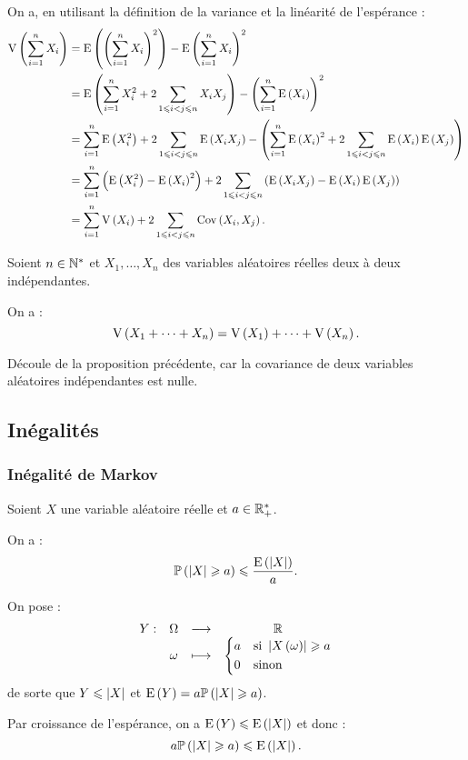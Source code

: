 \begin{dem}
On a, en utilisant la définition de la variance et la linéarité de l'espérance : \[\begin{aligned}
\vari{\sum_{i=1}^nX_i}&=\esp{\paren{\sum_{i=1}^nX_i}^2}-\esp{\sum_{i=1}^nX_i}^2 \\
&=\esp{\sum_{i=1}^nX_i^2+2\sum_{1\leq i<j\leq n}X_iX_j}-\paren{\sum_{i=1}^n\esp{X_i}}^2 \\
&=\sum_{i=1}^n\esp{X_i^2}+2\sum_{1\leq i<j\leq n}\esp{X_iX_j}-\paren{\sum_{i=1}^n\esp{X_i}^2+2\sum_{1\leq i<j\leq n}\esp{X_i}\esp{X_j}} \\
&=\sum_{i=1}^n\paren{\esp{X_i^2}-\esp{X_i}^2}+2\sum_{1\leq i<j\leq n}\paren{\esp{X_iX_j}-\esp{X_i}\esp{X_j}} \\
&=\sum_{i=1}^n\vari{X_i}+2\sum_{1\leq i<j\leq n}\cov{X_i}{X_j}.
\end{aligned}\]
\end{dem}

\begin{cor}
Soient \(n\in\Ns\) et \(X_1,\dots,X_n\) des variables aléatoires réelles deux à deux indépendantes.

On a : \[\vari{X_1+\dots+X_n}=\vari{X_1}+\dots+\vari{X_n}.\]
\end{cor}

\begin{dem}
Découle de la proposition précédente, car la covariance de deux variables aléatoires indépendantes est nulle.
\end{dem}

\subsection{Inégalités}

\subsubsection{Inégalité de Markov}

\begin{prop}
Soient \(X\) une variable aléatoire réelle et \(a\in\Rps\).

On a : \[\proba{\abs{X}\geq a}\leq\dfrac{\esp{\abs{X}}}{a}.\]
\end{prop}

\begin{dem}
On pose : \[\fonction{Y}{\Omega}{\R}{\omega}{\begin{dcases}
a &\text{si }\abs{X\paren{\omega}}\geq a \\
0 &\text{sinon}
\end{dcases}}\] de sorte que \(Y\leq\abs{X}\) et \(\esp{Y}=a\proba{\abs{X}\geq a}\).

Par croissance de l'espérance, on a \(\esp{Y}\leq\esp{\abs{X}}\) et donc : \[a\proba{\abs{X}\geq a}\leq\esp{\abs{X}}.\]
\end{dem}

